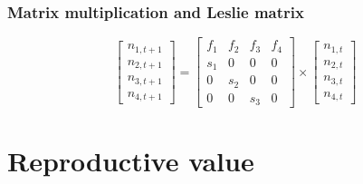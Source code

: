 \documentclass[color=usenames,dvipsnames]{beamer}\usepackage[]{graphicx}\usepackage[]{xcolor}
\begin{document}
\begin{frame}
  \frametitle{Matrix multiplication and Leslie matrix}
  \Large
  \begin{center}
    \[
    \begin{bmatrix}
      n_{1,t+1} \\
      n_{2,t+1} \\
      n_{3,t+1} \\
      n_{4,t+1}
    \end{bmatrix}
    =
    \begin{bmatrix}
      f_1 & f_2 & f_3 & f_4 \\
      s_1 & 0 & 0 & 0 \\
      0 & s_2 & 0 & 0 \\
      0 & 0 & s_3 & 0
    \end{bmatrix}
    \times
    \begin{bmatrix}
      n_{1,t} \\
      n_{2,t} \\
      n_{3,t} \\
      n_{4,t}
    \end{bmatrix}
    \]
  \end{center}
\end{frame}





























\section{Reproductive value}
\end{document}

